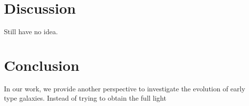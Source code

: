 \documentclass[fleqn,usenatbib]{mnras}
\begin{document}
\section{Discussion}
Still have no idea. 
\section{Conclusion}
In our work, we provide another perspective to investigate the evolution of early type galaxies. Instead of trying to obtain the full light 






\end{document}

